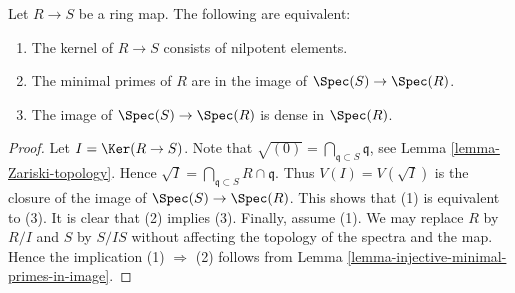 \begin{lemma}
\label{lemma-image-dense-generic-points}
Let $R \to S$ be a ring map. The following are equivalent:
\begin{enumerate}
\item The kernel of $R \to S$ consists of nilpotent elements.
\item The minimal primes of $R$ are in the image of
$\Spec(S) \to \Spec(R)$.
\item The image of $\Spec(S) \to \Spec(R)$ is dense
in $\Spec(R)$.
\end{enumerate}
\end{lemma}

\begin{proof}
Let $I = \Ker(R \to S)$. Note that
$\sqrt{(0)} = \bigcap_{\mathfrak q \subset S} \mathfrak q$, see
Lemma \ref{lemma-Zariski-topology}.
Hence $\sqrt{I} = \bigcap_{\mathfrak q \subset S} R \cap \mathfrak q$.
Thus $V(I) = V(\sqrt{I})$ is the closure of the image of
$\Spec(S) \to \Spec(R)$.
This shows that (1) is equivalent to (3). It is clear that
(2) implies (3). Finally, assume (1). We may replace
$R$ by $R/I$ and $S$ by $S/IS$ without affecting the topology
of the spectra and the map. Hence the implication (1) $\Rightarrow$ (2)
follows from Lemma \ref{lemma-injective-minimal-primes-in-image}.
\end{proof}
